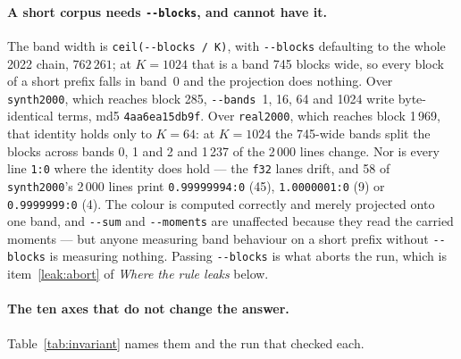 \documentclass[11pt,a4paper]{article}
\newcommand{\flag}[1]{\texttt{-{}-#1}}
\begin{document}
\paragraph{A short corpus needs \flag{blocks}, and cannot have it.} The band
width is \texttt{ceil(-{}-blocks / K)}, with \flag{blocks} defaulting to the
whole 2022 chain, $762\,261$; at $K=1024$ that is a band 745 blocks wide, so
every block of a short prefix falls in band~0 and the projection does nothing.
Over \texttt{synth2000}, which reaches block 285, \flag{bands}~1, 16, 64 and
1024 write byte-identical terms, md5 \texttt{4aa6ea15db9f}. Over
\texttt{real2000}, which reaches block 1\,969, that identity holds only to
$K=64$: at $K=1024$ the 745-wide bands split the blocks across bands 0, 1 and 2
and 1\,237 of the 2\,000 lines change. Nor is every line \texttt{1:0} where
the identity does hold --- the \texttt{f32} lanes drift, and 58 of
\texttt{synth2000}'s 2\,000 lines print \texttt{0.99999994:0} (45),
\texttt{1.0000001:0} (9) or \texttt{0.9999999:0} (4). The colour is computed
correctly and merely projected onto one band, and \flag{sum} and \flag{moments}
are unaffected because they read the carried moments --- but anyone measuring
band behaviour on a short prefix without \flag{blocks} is measuring nothing.
Passing \flag{blocks} is what aborts the run, which is
item~\ref{leak:abort} of \emph{Where the rule leaks} below.

\paragraph{The ten axes that do not change the answer.}
Table~\ref{tab:invariant} names them and the run that checked each.
\end{document}
